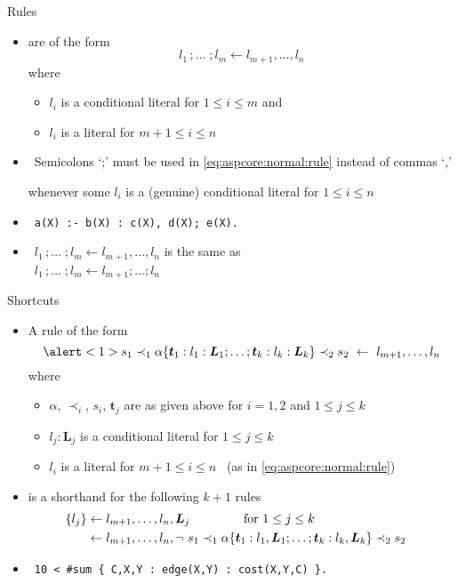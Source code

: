 \begin{frame}{Rules}
  \begin{itemize}
  \item {} are of the form
    \begin{equation}
      \label{eq:aspcore:normal:rule}
       l_1\,;\dots\;;l_m\leftarrow  l_{m+1},\dots, l_n
    \end{equation}
    where
    \begin{itemize}
    \item $l_i$ is a conditional literal for $1\leq i\leq m$ and
    \item $l_i$ is a literal for $m+1\leq i\leq n$
    \end{itemize}
    \medskip
  \item<2->  \ Semicolons `;' must be used in \eqref{eq:aspcore:normal:rule} instead of commas `,'
    \par whenever some $l_i$ is a (genuine) conditional literal for $1\leq i\leq n$
  \item<3->  \  \texttt{a(X) :- b(X) : c(X), d(X)\alert{;} e(X).}
  \item<4->  \ $l_1\,;\dots\;;l_m\leftarrow  l_{m+1},\dots, l_n$ is the same as
  \\ \phantom{Note} \ $l_1\,;\dots\;;l_m\leftarrow  l_{m+1};\dots;l_n$
  \end{itemize}
\end{frame}
\begin{frame}{Shortcuts}
  \begin{itemize}
  \item<2-> A rule of the form
    \[
    \alert<1>{s_1\prec_1\alpha\{\boldsymbol{t}_1:l_1:\boldsymbol{L}_1;\dots;\boldsymbol{t}_k:l_k:\boldsymbol{L}_k\}\prec_2 s_2}
    \ \leftarrow \
     l_{m+1},\dots, l_n
    \]
    where
    \begin{itemize}
    \item $\alpha$, $\prec_i$, $s_i$, $\boldsymbol{t}_j$ are as given above for $i=1,2$ and $1\leq j\leq k$
    \item $l_j:\boldsymbol{L}_j$ is a conditional literal for $1\leq j\leq k$
    \item $l_i$ is a literal for $m+1\leq i\leq n$ \ (as in \eqref{eq:aspcore:normal:rule})
    \end{itemize}
    \medskip
  \item<3->[] is a shorthand for the following $k+1$ rules
    \begin{align*}\hspace{-10pt}
      \{ l_j\}&\leftarrow  l_{m+1},\dots, l_n,\boldsymbol{L}_j\qquad\qquad\text{ for }1\leq j\leq k\\
                &\leftarrow  l_{m+1},\dots, l_n,\neg{~s_1\prec_1\alpha\{\boldsymbol{t}_1:l_1,\boldsymbol{L}_1;\dots;\boldsymbol{t}_k:l_k,\boldsymbol{L}_k\}\prec_2 s_2}
      \end{align*}
  \item<3->  \
    \texttt{10 < \#sum \{ C,X,Y : edge(X,Y) : cost(X,Y,C) \}.}
  \end{itemize}
\end{frame}
